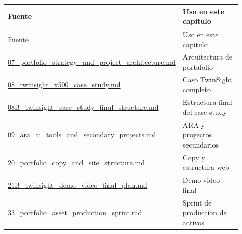 \begin{center}
\scriptsize
\begin{longtable}{>{\raggedright\arraybackslash}p{0.455\linewidth} >{\raggedright\arraybackslash}p{0.455\linewidth}}
\toprule
Fuente & Uso en este capitulo \\
\midrule
\endfirsthead
\toprule
Fuente & Uso en este capitulo \\
\midrule
\endhead
\href{file:///E:/Laboral/07_portfolio_strategy_and_project_architecture.md}{07\_portfolio\_strategy\_and\_project\_architecture.md} & Arquitectura de portafolio \\
\href{file:///E:/Laboral/08_twinsight_x500_case_study.md}{08\_twinsight\_x500\_case\_study.md} & Caso TwinSight completo \\
\href{file:///E:/Laboral/08B_twinsight_case_study_final_structure.md}{08B\_twinsight\_case\_study\_final\_structure.md} & Estructura final del case study \\
\href{file:///E:/Laboral/09_ara_ai_tools_and_secondary_projects.md}{09\_ara\_ai\_tools\_and\_secondary\_projects.md} & ARA y proyectos secundarios \\
\href{file:///E:/Laboral/20_portfolio_copy_and_site_structure.md}{20\_portfolio\_copy\_and\_site\_structure.md} & Copy y estructura web \\
\href{file:///E:/Laboral/21B_twinsight_demo_video_final_plan.md}{21B\_twinsight\_demo\_video\_final\_plan.md} & Demo video final \\
\href{file:///E:/Laboral/33_portfolio_asset_production_sprint.md}{33\_portfolio\_asset\_production\_sprint.md} & Sprint de produccion de activos \\
\bottomrule
\end{longtable}
\end{center}


